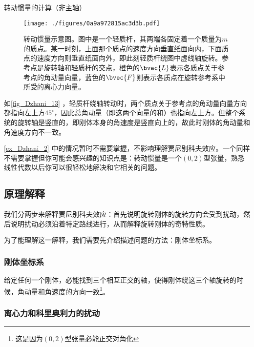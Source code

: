 \begin{example}{转动惯量的计算（非主轴）}\label{ex_Dzhani_2}


\begin{figure}[ht]
\centering
\texttt{[image: ./figures/0a9a972815ac3d3b.pdf]}
\caption{转动惯量示意图。图中是一个轻质杆，其两端各固定着一个质量为$m$的质点。某一时刻，上面那个质点的速度方向垂直纸面向内，下面质点的速度方向则垂直纸面向外，即此刻轻质杆绕图中虚线轴旋转。参考点是旋转轴和轻质杆的交点，橙色的$\bvec{L}$表示各质点关于参考点的角动量向量，蓝色的$\bvec{F}$则表示各质点在旋转参考系中所受的离心力向量。} \label{fig_Dzhani_13}
\end{figure}

如\autoref{fig_Dzhani_13} ，轻质杆绕轴转动时，两个质点关于参考点的角动量向量方向都指向左上方$45^\circ$，因此总角动量（即这两个向量的和）也指向左上方。但整个系统的旋转轴是竖直的，即刚体本身的角速度是竖直向上的，故此时刚体的角动量和角速度方向不一致。


\end{example}


\autoref{ex_Dzhani_2} 中的情况暂时不需要掌握，不影响理解贾尼别科夫效应。一个同样不需要掌握但你可能会感兴趣的知识点是：转动惯量是一个$(0, 2)$型张量，熟悉线性代数以后你可以很轻松地解决和它相关的问题。





\subsection{原理解释}

我们分两步来解释贾尼别科夫效应：首先说明旋转刚体的旋转方向会受到扰动，然后说明扰动必须沿着特定路线进行，从而解释旋转刚体的奇特性质。

为了能理解这一解释，我们需要先介绍描述问题的方法：刚体坐标系。

\subsubsection{刚体坐标系}



给定任何一个刚体，必能找到三个相互正交的轴，使得刚体绕这三个轴旋转的时候，角动量和角速度的方向一致\footnote{这是因为$(0, 2)$型张量必能正交对角化}。




\subsubsection{离心力和科里奥利力的扰动}







